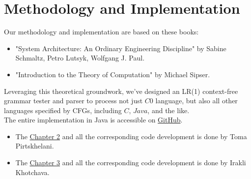 \section*{Methodology and Implementation}
Our methodology and implementation are based on these books:
\begin{itemize}
    \item "System Architecture: An Ordinary Engineering Discipline" by Sabine Schmaltz, Petro Lutsyk, Wolfgang J. Paul. \cite{sysbook}
    \item "Introduction to the Theory of Computation"
    by Michael Sipser. \cite{sipser}
\end{itemize}
\setlength{\parindent}{0pt}

Leveraging this theoretical groundwork, we've designed an LR(1) context-free grammar tester and parser to process not just \(C0\) language, but also all other languages specified by CFGs, including \(C\), \(Java\), and the like.\\

The entire implementation in Java is accessible on \href{https://github.com/fyfsb/dcfg.git}{GitHub}.

\begin{itemize}
    \item The \hyperref[ch:Lexical and Syntactic Analysis]{Chapter 2} and all the corresponding code development is done by Toma Pirtskhelani.
    \item The \hyperref[ch:backend]{Chapter 3} and all the corresponding code development is done by Irakli Khotchava.
\end{itemize}

